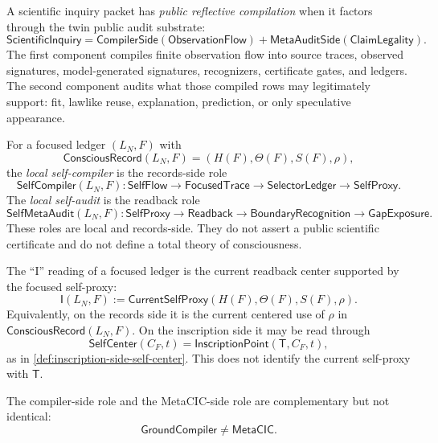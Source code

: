 \begin{definition}
\label{def:scientific-inquiry-public-reflective-compilation}
A scientific inquiry packet has \emph{public reflective compilation} when
it factors through the twin public audit substrate:
$$
\mathsf{ScientificInquiry}
=
\mathsf{CompilerSide}(\mathsf{ObservationFlow})
+
\mathsf{MetaAuditSide}(\mathsf{ClaimLegality}).
$$
The first component compiles finite observation flow into source traces,
observed signatures, model-generated signatures, recognizers, certificate
gates, and ledgers. The second component audits what those compiled rows
may legitimately support: fit, lawlike reuse, explanation, prediction,
or only speculative appearance.
\end{definition}

\begin{definition}
\label{def:local-self-compiler-and-audit}
For a focused ledger $(L_N,F)$ with
$$
\mathsf{ConsciousRecord}(L_N,F)
=
(H(F),\Theta(F),S(F),\rho),
$$
the \emph{local self-compiler} is the records-side role
$$
\mathsf{SelfCompiler}(L_N,F):
\mathsf{SelfFlow}
\to
\mathsf{FocusedTrace}
\to
\mathsf{SelectorLedger}
\to
\mathsf{SelfProxy}.
$$
The \emph{local self-audit} is the readback role
$$
\mathsf{SelfMetaAudit}(L_N,F):
\mathsf{SelfProxy}
\to
\mathsf{Readback}
\to
\mathsf{BoundaryRecognition}
\to
\mathsf{GapExposure}.
$$
These roles are local and records-side. They do not assert a public
scientific certificate and do not define a total theory of consciousness.
\end{definition}

\begin{definition}
\label{def:current-self-proxy}
The ``I'' reading of a focused ledger is the current readback center
supported by the focused self-proxy:
$$
\mathsf{I}(L_N,F)
:=
\mathsf{CurrentSelfProxy}(H(F),\Theta(F),S(F),\rho).
$$
Equivalently, on the records side it is the current centered use of
$\rho$ in $\mathsf{ConsciousRecord}(L_N,F)$. On the inscription side it
may be read through
$$
\mathsf{SelfCenter}(C_F,t)
=
\mathsf{InscriptionPoint}(\mathsf{T},C_F,t),
$$
as in \autoref{def:inscription-side-self-center}. This does not identify
the current self-proxy with $\mathsf{T}$.
\end{definition}

\begin{theorem}
\label{thm:groundcompiler-metacic-roles-do-not-collapse}
The compiler-side role and the MetaCIC-side role are complementary but
not identical:
$$
\mathsf{GroundCompiler}\neq\mathsf{MetaCIC}.
$$
\end{theorem}

